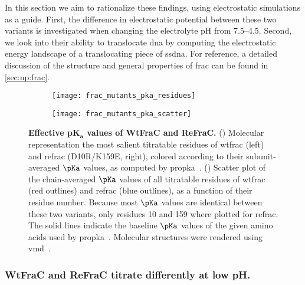 In this section we aim to rationalize these findings, using electrostatic simulations as a guide. First, the
difference in electrostatic potential between these two variants is investigated when changing the electrolyte
pH from \numrange{7.5}{4.5}. Second, we look into their ability to translocate \gls{dna} by computing the
electrostatic energy landscape of a translocating piece of \gls{ssdna}. For reference, a detailed discussion
of the structure and general properties of \gls{frac} can be found in \cref{sec:np:frac}.

%
\begin{figure*}[t]
  \centering
  \medskip
  \begin{subfigure}[t]{65mm}
    \centering
    \caption{}\vspace{-5mm}\hspace{1.5mm}\label{fig:frac_mutants_pka_residues}
    \texttt{[image: frac\_mutants\_pka\_residues]}
  \end{subfigure}
  \begin{subfigure}[t]{50mm}
    \centering
    \caption{}\vspace{-2.5mm}\hspace{1.5mm}\label{fig:frac_mutants_pka_scatter}
    \texttt{[image: frac\_mutants\_pka\_scatter]}
  \end{subfigure}

\caption[Effective $\pKa$ values of {WtFraC} and {ReFraC}]{%
  \textbf{Effective p$\boldsymbol{K}_{\mathbf{a}}$ values of {WtFraC} and {ReFraC}.}
  ()
  Molecular representation the most salient titratable residues of \gls{wtfrac} (left) and \gls{refrac}
  (D10R/K159E, right), colored according to their subunit-averaged $\pKa$ values, as computed by
  \gls{propka}~\cite{Olsson-2011,Sondergaard-2011}.
  ()
  Scatter plot of the chain-averaged $\pKa$ values of all titratable residues of \gls{wtfrac} (red outlines)
  and \gls{refrac} (blue outlines), as a function of their residue number. Because most $\pKa$ values are
  identical between these two variants, only residues 10 and 159 where plotted for \gls{refrac}. The solid
  lines indicate the baseline $\pKa$ values of the given amino acids used by
  \gls{propka}~\cite{Olsson-2011,Sondergaard-2011}.
  Molecular structures were rendered using \gls{vmd}~\cite{Humphrey-1996,Stone-1998}.
  }\label{fig:frac_mutants_pka}
\end{figure*}
%

\subsubsection{{WtFraC} and {ReFraC} titrate differently at low pH.}
%

